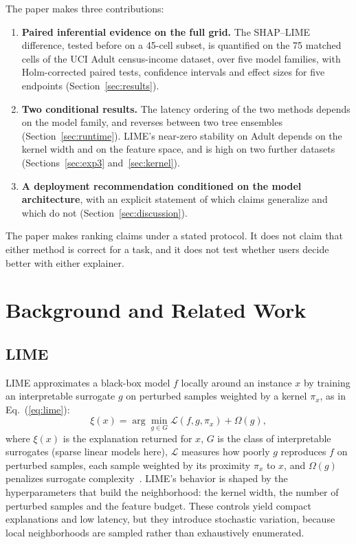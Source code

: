 \documentclass[11pt,a4paper]{article}
\begin{document}
The paper makes three contributions:
\begin{enumerate}
\item \textbf{Paired inferential evidence on the full grid.} The SHAP--LIME
difference, tested before on a 45-cell subset, is quantified on the 75
matched cells of the UCI Adult census-income dataset, over five model
families, with Holm-corrected paired tests, confidence intervals and effect
sizes for five endpoints (Section~\ref{sec:results}).
\item \textbf{Two conditional results.} The latency ordering of the two
methods depends on the model family, and reverses between two tree
ensembles (Section~\ref{sec:runtime}). LIME's near-zero stability on Adult
depends on the kernel width and on the feature space, and is high on two
further datasets (Sections~\ref{sec:exp3} and~\ref{sec:kernel}).
\item \textbf{A deployment recommendation conditioned on the model
architecture}, with an explicit statement of which claims generalize and
which do not (Section~\ref{sec:discussion}).
\end{enumerate}

The paper makes ranking claims under a stated protocol. It does not claim
that either method is correct for a task, and it does not test whether users
decide better with either explainer.

\section{Background and Related Work}
\label{sec:background}

\subsection{LIME}

LIME approximates a black-box model $f$ locally around an instance $x$ by
training an interpretable surrogate $g$ on perturbed samples weighted by a
kernel $\pi_x$, as in Eq.~(\ref{eq:lime}):
\begin{equation}
\xi(x) = \arg\min_{g \in G} \mathcal{L}(f, g, \pi_x) + \Omega(g),
\label{eq:lime}
\end{equation}
where $\xi(x)$ is the explanation returned for $x$, $G$ is the class of
interpretable surrogates (sparse linear models here), $\mathcal{L}$
measures how poorly $g$ reproduces $f$ on perturbed samples, each sample
weighted by its proximity $\pi_x$ to $x$, and $\Omega(g)$ penalizes
surrogate complexity~\cite{ribeiro2016why}. LIME's behavior is shaped by
the hyperparameters that build the neighborhood: the kernel width, the
number of perturbed samples and the feature budget. These controls yield
compact explanations and low latency, but they introduce stochastic
variation, because local neighborhoods are sampled rather than exhaustively
enumerated.
\end{document}
